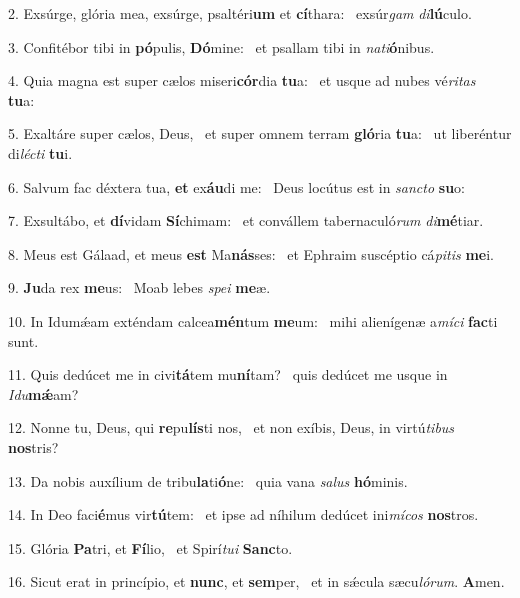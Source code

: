 2. Exsúrge, glória mea, exsúrge, psaltéri\textbf{um} et \textbf{cí}thara: \ast\  exsúr\textit{gam} \textit{di}\textbf{lú}culo.\

3. Confitébor tibi in \textbf{pó}pulis, \textbf{Dó}mine: \ast\  et psallam tibi in \textit{na}\textit{ti}\textbf{ó}nibus.\

4. Quia magna est super cælos miseri\textbf{cór}dia \textbf{tu}a: \ast\  et usque ad nubes vé\textit{ri}\textit{tas} \textbf{tu}a:\

5. Exaltáre super cælos, Deus, \dag\  et super omnem terram \textbf{gló}ria \textbf{tu}a: \ast\  ut liberéntur di\textit{léc}\textit{ti} \textbf{tu}i.\

6. Salvum fac déxtera tua, \textbf{et} ex\textbf{áu}di me: \ast\  Deus locútus est in \textit{sanc}\textit{to} \textbf{su}o:\

7. Exsultábo, et \textbf{dí}vidam \textbf{Sí}chimam: \ast\  et convállem tabernaculó\textit{rum} \textit{di}\textbf{mé}tiar.\

8. Meus est Gálaad, et meus \textbf{est} Ma\textbf{nás}ses: \ast\  et Ephraim suscéptio cá\textit{pi}\textit{tis} \textbf{me}i.\

9. \textbf{Ju}da rex \textbf{me}us: \ast\  Moab lebes \textit{spe}\textit{i} \textbf{me}æ.\

10. In Idumǽam exténdam calcea\textbf{mén}tum \textbf{me}um: \ast\  mihi alienígenæ a\textit{mí}\textit{ci} \textbf{fac}ti sunt.\

11. Quis dedúcet me in civi\textbf{tá}tem mu\textbf{ní}tam? \ast\  quis dedúcet me usque in \textit{I}\textit{du}\textbf{mǽ}am?\

12. Nonne tu, Deus, qui \textbf{re}pu\textbf{lís}ti nos, \ast\  et non exíbis, Deus, in virtú\textit{ti}\textit{bus} \textbf{nos}tris?\

13. Da nobis auxílium de tribu\textbf{la}ti\textbf{ó}ne: \ast\  quia vana \textit{sa}\textit{lus} \textbf{hó}minis.\

14. In Deo faci\textbf{é}mus vir\textbf{tú}tem: \ast\  et ipse ad níhilum dedúcet ini\textit{mí}\textit{cos} \textbf{nos}tros.\

15. Glória \textbf{Pa}tri, et \textbf{Fí}lio, \ast\  et Spirí\textit{tu}\textit{i} \textbf{Sanc}to.\

16. Sicut erat in princípio, et \textbf{nunc}, et \textbf{sem}per, \ast\  et in sǽcula sæcu\textit{ló}\textit{rum}. \textbf{A}men.\

